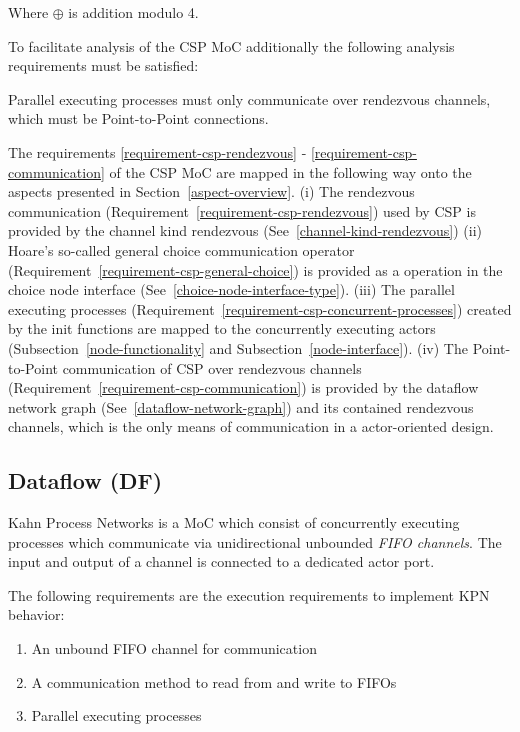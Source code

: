 Where $\oplus$ is addition modulo 4.

To facilitate analysis of the CSP MoC additionally the following
analysis requirements must be satisfied:
\begin{requirement}\label{requirement-csp-communication}
  Parallel executing processes must only communicate over rendezvous channels,
  which must be Point-to-Point connections.
\end{requirement}

The requirements \ref{requirement-csp-rendezvous} -
\ref{requirement-csp-communication} of the CSP MoC are mapped in the following way
onto the aspects presented in Section~\ref{aspect-overview}.
(i) The rendezvous communication (Requirement~\ref{requirement-csp-rendezvous})
used by CSP is provided by the channel kind rendezvous (See~\ref{channel-kind-rendezvous})
(ii) Hoare's so-called general choice communication operator (Requirement~\ref{requirement-csp-general-choice})
is provided as a operation in the choice node interface (See~\ref{choice-node-interface-type}).
(iii) The parallel executing processes (Requirement~\ref{requirement-csp-concurrent-processes})
created by the init functions are mapped to the concurrently executing actors
(Subsection~\ref{node-functionality} and Subsection~\ref{node-interface}).
(iv) The Point-to-Point communication of CSP over rendezvous channels (Requirement~\ref{requirement-csp-communication})
is provided by the dataflow network graph (See~\ref{dataflow-network-graph}) and
its contained rendezvous channels, which is the only means of communication in a
actor-oriented design.

\subsection{Dataflow (DF)}
Kahn Process Networks \cite{kahn:1974}
is a MoC which consist of concurrently executing processes
which communicate via unidirectional unbounded \emph{FIFO channels}.
The input and output of a channel is connected to a dedicated
actor port.

The following requirements are the execution requirements to
implement KPN behavior:

\begin{enumerate}
\item An unbound FIFO channel for communication
\item A communication method to read from and write to FIFOs
\item Parallel executing processes
\end{enumerate}

